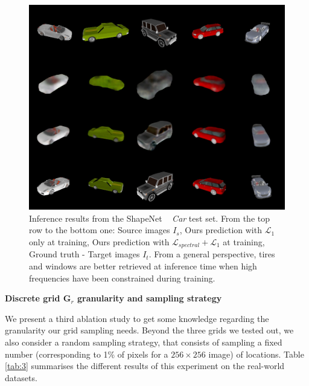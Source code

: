 \begin{figure}[h!]
    \begin{center}
    \includegraphics[width=.5\textwidth]{images/epipolarnvs/spectralCar.jpg}
    \end{center}
     \caption{Inference results from the ShapeNet ~\cite{chang2015shapenet} \textit{Car} test set. From the top row to the bottom one: Source images  $I_s$, Ours prediction with $\mathcal{L}_{1}$ only at training, Ours prediction with  $\mathcal{L}_{spectral} + \mathcal{L}_{1}$ at training, Ground truth - Target images $I_t$. From a general perspective, tires and windows are better retrieved at inference time when high frequencies have been constrained during training.}
     \label{fig:spectral_res}
\end{figure}

\textbf{Discrete grid $\textbf{G}_{r}$ granularity and sampling strategy}

We present a third ablation study to get some knowledge regarding the granularity our grid sampling needs. Beyond the three grids we tested out, we also consider a random sampling strategy, that consists of sampling a fixed number (corresponding to 1\% of pixels for a $256\times 256$ image) of locations. Table \ref{tab:3} summarises the different results of this experiment on the real-world datasets.

